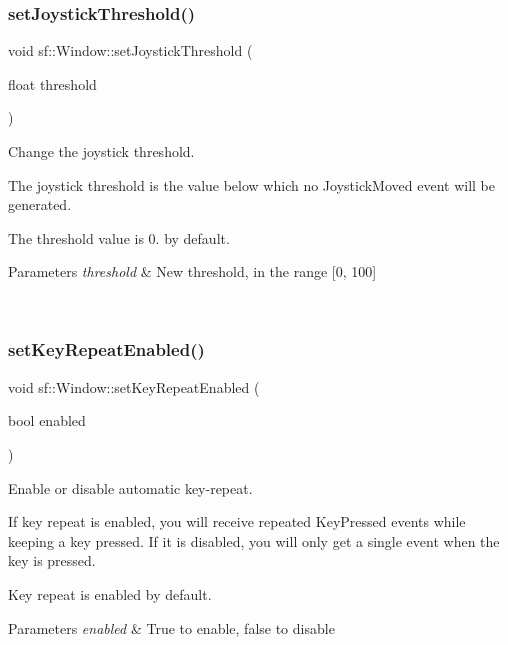 \subsubsection{\texorpdfstring{setJoystickThreshold()}{setJoystickThreshold()}}
{\footnotesize\ttfamily void sf\+::\+Window\+::set\+Joystick\+Threshold (\begin{DoxyParamCaption}\item[{float}]{threshold }\end{DoxyParamCaption})}



Change the joystick threshold. 

The joystick threshold is the value below which no Joystick\+Moved event will be generated.

The threshold value is 0. by default.


\begin{DoxyParams}{Parameters}
{\em threshold} & New threshold, in the range \mbox{[}0, 100\mbox{]} \begin{DoxyVerb}\end{DoxyVerb}
 \\
\hline
\end{DoxyParams}
\mbox{\label{classsf_1_1_window_aef9f2b14c10ecba8a8df95dd51c5bb73}} 
\subsubsection{\texorpdfstring{setKeyRepeatEnabled()}{setKeyRepeatEnabled()}}
{\footnotesize\ttfamily void sf\+::\+Window\+::set\+Key\+Repeat\+Enabled (\begin{DoxyParamCaption}\item[{bool}]{enabled }\end{DoxyParamCaption})}



Enable or disable automatic key-\/repeat. 

If key repeat is enabled, you will receive repeated Key\+Pressed events while keeping a key pressed. If it is disabled, you will only get a single event when the key is pressed.

Key repeat is enabled by default.


\begin{DoxyParams}{Parameters}
{\em enabled} & True to enable, false to disable \begin{DoxyVerb}\end{DoxyVerb}
 \\
\hline
\end{DoxyParams}
\mbox{\label{classsf_1_1_window_aab7a05baece72b08ad120063b143d19b}} 
